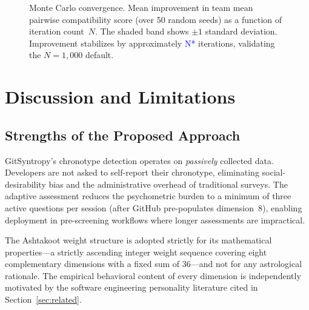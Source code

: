 \documentclass[conference]{IEEEtran}
\newcommand{\RESULT}[1]{\textcolor{blue}{#1}}   %
\begin{document}
\begin{figure}[t]
  \centering
  \caption{Monte Carlo convergence.
    Mean improvement in team mean pairwise compatibility score
    (over 50 random seeds) as a function of iteration count~$N$.
    The shaded band shows $\pm 1$ standard deviation.
    Improvement stabilizes by approximately \RESULT{N*} iterations,
    validating the $N{=}1{,}000$ default.}
  \label{fig:convergence}
\end{figure}

\section{Discussion and Limitations}
\label{sec:discussion}

\subsection{Strengths of the Proposed Approach}

GitSyntropy's chronotype detection operates on \emph{passively}
collected data.
Developers are not asked to self-report their chronotype, eliminating
social-desirability bias and the administrative overhead of traditional
surveys.
The adaptive assessment reduces the psychometric burden to a minimum
of three active questions per session (after GitHub pre-populates
dimension~8), enabling deployment in pre-screening workflows where
longer assessments are impractical.

The Ashtakoot weight structure is adopted strictly for its mathematical
properties—a strictly ascending integer weight sequence covering eight
complementary dimensions with a fixed sum of 36—and not for any
astrological rationale.
The empirical behavioral content of every dimension is independently
motivated by the software engineering personality literature cited in
Section~\ref{sec:related}.
\end{document}
